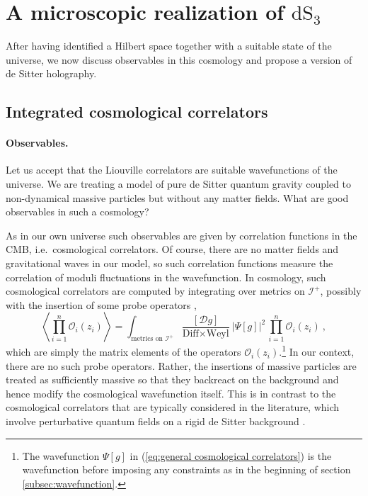 \documentclass[12pt,a4paper]{article}
\newcommand{\be}{\begin{equation}}
\newcommand{\ee}{\end{equation}}
\begin{document}
\section{A microscopic realization of \texorpdfstring{$\text{dS}_3$}{dS3}} \label{sec:dual}
After having identified a Hilbert space together with a suitable state of the universe, we now discuss observables in this cosmology and propose a version of de Sitter holography. 
\subsection{Integrated cosmological correlators}

\paragraph{Observables.} Let us accept that the Liouville correlators are suitable wavefunctions of the universe. We are treating a model of pure de Sitter quantum gravity coupled to non-dynamical massive particles but without any matter fields. What are good observables in such a cosmology?

As in our own universe such observables are given by correlation functions in the CMB, i.e.\ cosmological correlators. Of course, there are no matter fields and gravitational waves in our model, so such correlation functions measure the correlation of moduli fluctuations in the wavefunction. In cosmology, such cosmological correlators are computed by integrating over metrics on $\mathcal{I}^+$, possibly with the insertion of some probe operators \cite{Maldacena:2002vr}, 
\be 
\left\langle \prod_{i=1}^n \mathcal{O}_i(z_i) \right\rangle =\int_{\text{metrics on $\mathcal{I}^+$}} \frac{[\mathcal{D} g]}{\text{Diff} \times \text{Weyl}}\ \big|\Psi[g]\big|^2\, \prod_{i=1}^n \mathcal{O}_i(z_i)~ , \label{eq:general cosmological correlators}
\ee
which are simply the matrix elements of the operators $\mathcal{O}_i(z_i)$.\footnote{The wavefunction $\Psi[g]$ in (\ref{eq:general cosmological correlators}) is the wavefunction before imposing any constraints as in the beginning of section \ref{subsec:wavefunction}.} In our context, there are no such probe operators. Rather, the insertions of massive particles are treated as sufficiently massive so that they backreact on the background and hence modify the cosmological wavefunction itself. 
This is in contrast to the cosmological correlators that are typically considered in the literature, which involve perturbative quantum fields on a rigid de Sitter background \cite{Hogervorst:2021uvp, DiPietro:2021sjt}.  
\end{document}

